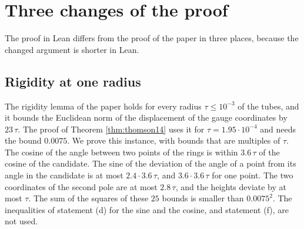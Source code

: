 \documentclass[reqno,a4paper,11pt]{amsart}
\begin{document}
\section{Three changes of the proof}

The proof in Lean differs from the proof of the paper in three places, because the changed argument is shorter in Lean.

\subsection*{Rigidity at one radius}
The rigidity lemma of the paper holds for every radius $\tau \leq 10^{-3}$ of the tubes, and it bounds the Euclidean norm of the displacement of the gauge coordinates by $23 \, \tau$. The proof of Theorem \ref{thm:thomson14} uses it for $\tau = 1.95 \cdot 10^{-4}$ and needs the bound $0.0075$. We prove this instance, with bounds that are multiples of $\tau$. The cosine of the angle between two points of the rings is within $3.6 \, \tau$ of the cosine of the candidate. The sine of the deviation of the angle of a point from its angle in the candidate is at most $2.4 \cdot 3.6 \, \tau$, and $3.6 \cdot 3.6 \, \tau$ for one point. The two coordinates of the second pole are at most $2.8 \, \tau$, and the heights deviate by at most $\tau$. The sum of the squares of these $25$ bounds is smaller than $0.0075^2$. The inequalities of statement (d) for the sine and the cosine, and statement (f), are not used.
\end{document}
